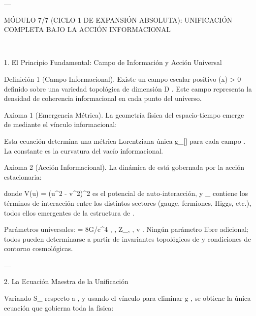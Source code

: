 \documentclass[12pt,twoside]{book}
\begin{document}
---

MÓDULO 7/7 (CICLO 1 DE EXPANSIÓN ABSOLUTA): UNIFICACIÓN COMPLETA BAJO LA ACCIÓN INFORMACIONAL

---

1. El Principio Fundamental: Campo de Información y Acción Universal

Definición 1 (Campo Informacional). Existe un campo escalar positivo  \rho(x) > 0  definido sobre una variedad topológica    de dimensión  D . Este campo representa la densidad de coherencia informacional en cada punto del universo.

Axioma 1 (Emergencia Métrica). La geometría física del espacio‑tiempo emerge de  \rho  mediante el vínculo informacional:


Esta ecuación determina una métrica Lorentziana única  g_{\mu\nu}[\rho]  para cada campo  \rho . La constante  \Lambda  es la curvatura del vacío informacional.

Axioma 2 (Acción Informacional). La dinámica de  \rho  está gobernada por la acción estacionaria:


donde  V(u) = (u^2 - v^2)^2  es el potencial de auto‑interacción, y  _{}  contiene los términos de interacción entre los distintos sectores (gauge, fermiones, Higgs, etc.), todos ellos emergentes de la estructura de  \rho .

Parámetros universales:  \kappa = 8\pi G/c^4 ,  \Lambda ,  Z_\rho ,  \lambda ,  v . Ningún parámetro libre adicional; todos pueden determinarse a partir de invariantes topológicos de    y condiciones de contorno cosmológicas.

---

2. La Ecuación Maestra de la Unificación

Variando  S_{}  respecto a  \rho , y usando el vínculo para eliminar  g , se obtiene la única ecuación que gobierna toda la física:

\end{document}
